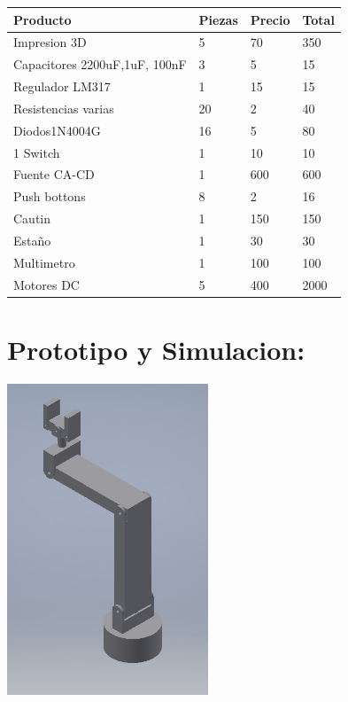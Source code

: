 \documentclass[14pt,a4paper]{article}
\begin{document}
\begin{tabular}{|l|l|l|l|}
\hline
	Producto & Piezas & Precio & Total\\
\hline
	Impresion 3D & 5 & 70 & 350\\

\hline
	Capacitores 2200uF,1uF, 100nF & 3 & 5 & 15\\
\hline
	Regulador LM317 & 1 & 15 & 15\\
\hline
	Resistencias varias & 20 & 2 & 40\\
\hline
	Diodos1N4004G & 16 & 5 & 80\\
\hline
	1 Switch & 1 & 10 & 10\\

\hline
	Fuente CA-CD & 1 & 600 & 600\\
\hline
	Push bottons & 8 & 2 & 16\\
\hline
    Cautin & 1 & 150 & 150\\
\hline
	Estaño & 1 & 30 & 30\\
\hline
	Multimetro & 1 & 100 & 100\\
\hline
    Motores DC & 5 & 400 & 2000\\
\hline
\end{tabular}

\section{Prototipo y Simulacion:}
\begin{center}
\includegraphics[width=6cm]{Proto.jpeg}
\end{center}

\newpage



\end{document}
